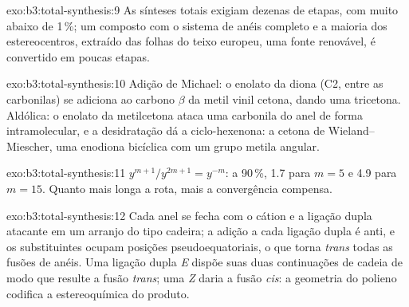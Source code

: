 \begin{solution}{exo:b3:total-synthesis:9}
As sínteses totais exigiam dezenas de etapas, com  muito abaixo de 1\,\%; um
composto com o sistema de anéis completo e a maioria dos estereocentros, extraído das
folhas do teixo europeu, uma fonte renovável, é convertido em poucas etapas.
\end{solution}

\begin{solution}{exo:b3:total-synthesis:10}
Adição de Michael: o enolato da diona (C2, entre as carbonilas) se adiciona ao
carbono $\beta$ da metil vinil cetona, dando uma tricetona. Aldólica: o enolato da metilcetona
ataca uma carbonila do anel de forma intramolecular, e a desidratação dá a
ciclo-hexenona: a cetona de Wieland--Miescher, uma enodiona bicíclica com um grupo metila
angular.
\end{solution}

\begin{solution}{exo:b3:total-synthesis:11}
$y^{m+1}/y^{2m+1} = y^{-m}$: a 90\,\%, 1.7 para $m = 5$ e 4.9 para $m = 15$. Quanto mais longa a rota, mais
a convergência compensa.
\end{solution}

\begin{solution}{exo:b3:total-synthesis:12}
Cada anel se fecha com o cátion e a ligação dupla atacante em um arranjo do tipo
cadeira; a adição a cada ligação dupla é anti, e os substituintes ocupam
posições pseudoequatoriais, o que torna \textit{trans} todas as fusões de anéis. Uma ligação dupla \textit{E}
dispõe suas duas continuações de cadeia de modo que resulte a fusão \textit{trans}; uma \textit{Z}
daria a fusão \textit{cis}: a geometria do polieno codifica a estereoquímica do
produto.
\end{solution}


